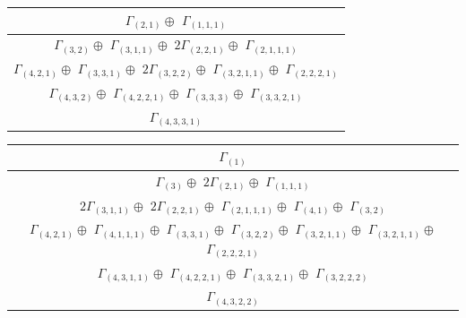 \documentclass[main.tex]{subfiles}
\begin{document}
\begin{minipage}{1\textwidth}
\centering
\begin{tabular}{c}
$\Gamma_{(
2 , 
1
)} \oplus$
$\Gamma_{(
1 , 
1 , 
1
)}$
\\ \hline
$\Gamma_{(
3 , 
2
)} \oplus$
$\Gamma_{(
3 , 
1 , 
1
)} \oplus$
$2\Gamma_{(
2 , 
2 , 
1
)} \oplus$
$\Gamma_{(
2 , 
1 , 
1 , 
1
)}$
\\ \hline
$\Gamma_{(
4 , 
2 , 
1
)} \oplus$
$\Gamma_{(
3 , 
3 , 
1
)} \oplus$
$2\Gamma_{(
3 , 
2 , 
2
)} \oplus$
$\Gamma_{(
3 , 
2 , 
1 , 
1
)} \oplus$
$\Gamma_{(
2 , 
2 , 
2 , 
1
)}$
\\ \hline
$\Gamma_{(
4 , 
3 , 
2
)} \oplus$
$\Gamma_{(
4 , 
2 , 
2 , 
1
)} \oplus$
$\Gamma_{(
3 , 
3 , 
3
)} \oplus$
$\Gamma_{(
3 , 
3 , 
2 , 
1
)}$
\\ \hline
$\Gamma_{(
4 , 
3 , 
3 , 
1
)}$
\\
\end{tabular}\end{minipage}
\bigskip
\begin{minipage}{1\textwidth}
\centering
\begin{tabular}{c}
$\Gamma_{(
1
)}$
\\ \hline
$\Gamma_{(
3
)} \oplus$
$2\Gamma_{(
2 , 
1
)} \oplus$
$\Gamma_{(
1 , 
1 , 
1
)}$
\\ \hline
$2\Gamma_{(
3 , 
1 , 
1
)} \oplus$
$2\Gamma_{(
2 , 
2 , 
1
)} \oplus$
$\Gamma_{(
2 , 
1 , 
1 , 
1
)} \oplus$
$\Gamma_{(
4 , 
1
)} \oplus$
$\Gamma_{(
3 , 
2
)}$
\\ \hline
$\Gamma_{(
4 , 
2 , 
1
)} \oplus$
$\Gamma_{(
4 , 
1 , 
1 , 
1
)} \oplus$
$\Gamma_{(
3 , 
3 , 
1
)} \oplus$
$\Gamma_{(
3 , 
2 , 
2
)} \oplus$
$\Gamma_{(
3 , 
2 , 
1 , 
1
)} \oplus$
$\Gamma_{(
3 , 
2 , 
1 , 
1
)} \oplus$
$\Gamma_{(
2 , 
2 , 
2 , 
1
)}$
\\ \hline
$\Gamma_{(
4 , 
3 , 
1 , 
1
)} \oplus$
$\Gamma_{(
4 , 
2 , 
2 , 
1
)} \oplus$
$\Gamma_{(
3 , 
3 , 
2 , 
1
)} \oplus$
$\Gamma_{(
3 , 
2 , 
2 , 
2
)}$
\\ \hline
$\Gamma_{(
4 , 
3 , 
2 , 
2
)}$
\\
\end{tabular}\end{minipage}
\bigskip
\end{document}
